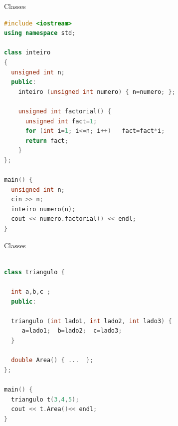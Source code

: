 \documentclass[hyperref={colorlinks=true}]{beamer}
\begin{document}
\begin{frame}[fragile]{Classes}

\lstset{ language=C++,         basicstyle=\tiny}

\begin{lstlisting}[language=C++]
#include <iostream>
using namespace std;

class inteiro 
{
  unsigned int n;
  public:
    inteiro (unsigned int numero) { n=numero; };

    unsigned int factorial() { 
      unsigned int fact=1;  
      for (int i=1; i<=n; i++)   fact=fact*i;
      return fact;
    }    
};

main() {
  unsigned int n;
  cin >> n;
  inteiro numero(n);
  cout << numero.factorial() << endl;
}

\end{lstlisting}
 
\end{frame}


\begin{frame}[fragile]{Classes}

\begin{lstlisting}[language=C++]
 
class triangulo {
  
  int a,b,c ;
  public:

  triangulo (int lado1, int lado2, int lado3) { 
     a=lado1;  b=lado2;  c=lado3;
  }

  double Area() { ...  };    
};

main() {
  triangulo t(3,4,5);
  cout << t.Area()<< endl;
}

\end{lstlisting}
 
\end{frame}
\end{document}
